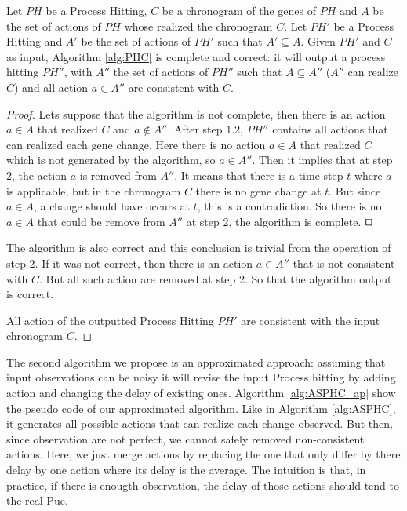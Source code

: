 \begin{theorem}
	\label{th:correct}
	Let $PH$ be a Process Hitting, $C$ be a chronogram of the genes of $PH$ and $A$ be the set of actions of $PH$ whose realized the chronogram $C$.
	Let $PH'$ be a Process Hitting and $A'$ be the set of actions of $PH'$ such that $A' \subseteq A$.
	Given $PH'$ and $C$ as input, Algorithm \ref{alg:PHC} is complete and correct: it will output a process hitting $PH''$,
	with $A''$ the set of actions of $PH''$ such that $A \subseteq A''$ ($A''$ can realize $C$) and all action $a \in A''$ are consistent with $C$.
	\begin{proof}
	Lets suppose that the algorithm is not complete, then there is an action $a \in A$ that realized $C$ and $a \not \in A''$.
	After step 1.2, $PH''$ contains all actions that can realized each gene change.
	Here there is no action $a \in A$ that realized $C$ which is not generated by the algorithm, so $a \in A''$.
	Then it implies that at step 2, the action $a$ is removed from $A''$.
	It means that there is a time step $t$ where $a$ is applicable, but in the chronogram $C$ there is no gene change at $t$.
	But since $a \in A$, a change should have occurs at $t$, this is a contradiction.
	So there is no $a \in A$ that could be remove from $A''$ at step 2, the algorithm is complete.
	$\qed$
	
	The algorithm is also correct and this conclusion is trivial from the operation of step 2.
	If it was not correct, then there is an action $a \in A''$ that is not consistent with $C$.
	But all such action are removed at step 2.
	So that the algorithm output is correct.
	
	All action of the outputted Process Hitting $PH'$ are consistent with the input chronogram $C$.
	\end{proof}
\end{theorem}

The second algorithm we propose is an approximated approach:
assuming that input observations can be noisy it will revise the input Process hitting by adding action and changing the delay of existing ones.
Algorithm \ref{alg:ASPHC_ap} show the pseudo code of our approximated algorithm.
Like in Algorithm \ref{alg:ASPHC}, it generates all possible actions that can realize each change observed.
But then, since observation are not perfect, we cannot safely removed non-consistent actions.
Here, we just merge actions by replacing the one that only differ by there delay by one action where its delay is the average.
The intuition is that, in practice, if there is enougth observation, the delay of those actions should tend to the real Pue.

